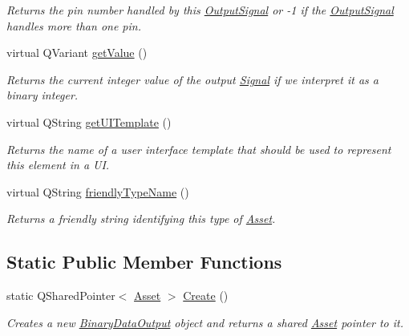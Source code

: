 \begin{DoxyCompactItemize}
\begin{DoxyCompactList}\small\item\em Returns the pin number handled by this \hyperlink{struct_picto_1_1_output_signal}{Output\-Signal} or -\/1 if the \hyperlink{struct_picto_1_1_output_signal}{Output\-Signal} handles more than one pin. \end{DoxyCompactList}\item 
virtual Q\-Variant \hyperlink{class_picto_1_1_binary_data_output_a35f6db4f5689148cd9854e67800e0f25}{get\-Value} ()
\begin{DoxyCompactList}\small\item\em Returns the current integer value of the output \hyperlink{class_picto_1_1_signal}{Signal} if we interpret it as a binary integer. \end{DoxyCompactList}\item 
\hypertarget{class_picto_1_1_binary_data_output_ace6cbb604b947ea33a0f86f59841e7cf}{virtual Q\-String \hyperlink{class_picto_1_1_binary_data_output_ace6cbb604b947ea33a0f86f59841e7cf}{get\-U\-I\-Template} ()}\label{class_picto_1_1_binary_data_output_ace6cbb604b947ea33a0f86f59841e7cf}

\begin{DoxyCompactList}\small\item\em Returns the name of a user interface template that should be used to represent this element in a U\-I. \end{DoxyCompactList}\item 
virtual Q\-String \hyperlink{class_picto_1_1_binary_data_output_a5cbce303776bfc19b4734db52663c211}{friendly\-Type\-Name} ()
\begin{DoxyCompactList}\small\item\em Returns a friendly string identifying this type of \hyperlink{class_picto_1_1_asset}{Asset}. \end{DoxyCompactList}\end{DoxyCompactItemize}
\subsection*{Static Public Member Functions}
\begin{DoxyCompactItemize}
\item 
\hypertarget{class_picto_1_1_binary_data_output_ab356dc4cd739742139e36dc2a329390a}{static Q\-Shared\-Pointer$<$ \hyperlink{class_picto_1_1_asset}{Asset} $>$ \hyperlink{class_picto_1_1_binary_data_output_ab356dc4cd739742139e36dc2a329390a}{Create} ()}\label{class_picto_1_1_binary_data_output_ab356dc4cd739742139e36dc2a329390a}

\begin{DoxyCompactList}\small\item\em Creates a new \hyperlink{class_picto_1_1_binary_data_output}{Binary\-Data\-Output} object and returns a shared \hyperlink{class_picto_1_1_asset}{Asset} pointer to it. \end{DoxyCompactList}\end{DoxyCompactItemize}
